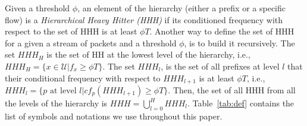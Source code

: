Given a threshold $\phi$, an element of the hierarchy (either a prefix or a specific flow) is a \textit{Hierarchical Heavy Hitter (HHH)} if its conditioned frequency with respect to the set of HHH  is at least $\phi T$.  Another way to define the set of HHH for a given a stream of packets and a threshold $\phi$, is to build it recursively. The set $HHH_H$ is the set of HH at the lowest level of the hierarchy, i.e., $HHH_H=\{x\in \mathcal U| f_x \geq \phi T\}$. The set $HHH_l$, is the set of all prefixes at level $l$ that their conditional frequency with respect to $HHH_{l+1}$ is at least $\phi T$, i.e., $HHH_l=\{p \text{ at level } l | cf_p(HHH_{l+1}) \geq \phi T\}$. Then, the set of all HHH from all the levels of the hierarchy is $HHH=\bigcup_{l=0}^{H}HHH_l$.
 Table~\ref{tab:def} contains the list of symbols and notations we use throughout this paper.
\begin{table}[ht]
	\caption{A list of symbols and notations}
	\label{tab:def}
\end{table}
